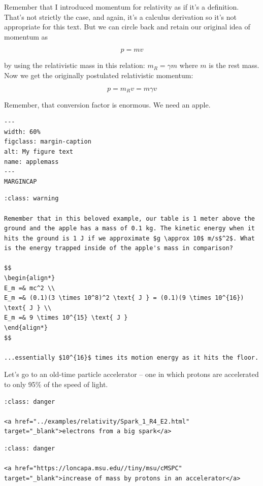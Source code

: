 \documentclass[
]{article}
\begin{document}
Remember that I introduced momentum for relativity as if it's a
definition. That's not strictly the case, and again, it's a calculus
derivation so it's not appropriate for this text. But we can circle back
and retain our original idea of momentum as

\[p=mv \nonumber\]

by using the relativistic mass in this relation: \(m_R = \gamma m\)
where \(m\) is the rest mass. Now we get the originally postulated
relativistic momentum:

\[p=m_Rv = m\gamma v \nonumber\]

Remember, that conversion factor is enormous. We need an apple.

\begin{verbatim}
---
width: 60%
figclass: margin-caption
alt: My figure text
name: applemass
---
MARGINCAP
\end{verbatim}

\begin{verbatim}
:class: warning

Remember that in this beloved example, our table is 1 meter above the ground and the apple has a mass of 0.1 kg. The kinetic energy when it hits the ground is 1 J if we approximate $g \approx 10$ m/s$^2$. What is the energy trapped inside of the apple's mass in comparison?

$$
\begin{align*}
E_m =& mc^2 \\
E_m =& (0.1)(3 \times 10^8)^2 \text{ J } = (0.1)(9 \times 10^{16}) \text{ J } \\
E_m =& 9 \times 10^{15} \text{ J }
\end{align*}
$$

...essentially $10^{16}$ times its motion energy as it hits the floor.
\end{verbatim}

Let's go to an old-time particle accelerator -- one in which protons are
accelerated to only 95\% of the speed of light.

\begin{verbatim}
:class: danger

<a href="../examples/relativity/Spark_1_R4_E2.html" target="_blank">electrons from a big spark</a>
\end{verbatim}

\begin{verbatim}
:class: danger

<a href="https://loncapa.msu.edu//tiny/msu/cMSPC"  target="_blank">increase of mass by protons in an accelerator</a>
\end{verbatim}
\end{document}
